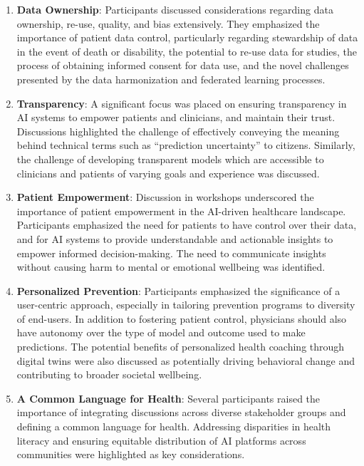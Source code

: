 \documentclass[
  letterpaper,
  DIV=11,
  numbers=noendperiod]{scrreport}
\begin{document}
\begin{enumerate}
\def\labelenumi{\arabic{enumi}.}
\item
  \textbf{Data Ownership}: Participants discussed considerations
  regarding data ownership, re-use, quality, and bias extensively. They
  emphasized the importance of patient data control, particularly
  regarding stewardship of data in the event of death or disability, the
  potential to re-use data for studies, the process of obtaining
  informed consent for data use, and the novel challenges presented by
  the data harmonization and federated learning processes.
\item
  \textbf{Transparency}: A significant focus was placed on ensuring
  transparency in AI systems to empower patients and clinicians, and
  maintain their trust. Discussions highlighted the challenge of
  effectively conveying the meaning behind technical terms such as
  ``prediction uncertainty'' to citizens. Similarly, the challenge of
  developing transparent models which are accessible to clinicians and
  patients of varying goals and experience was discussed.
\item
  \textbf{Patient Empowerment}: Discussion in workshops underscored the
  importance of patient empowerment in the AI-driven healthcare
  landscape. Participants emphasized the need for patients to have
  control over their data, and for AI systems to provide understandable
  and actionable insights to empower informed decision-making. The need
  to communicate insights without causing harm to mental or emotional
  wellbeing was identified.
\item
  \textbf{Personalized Prevention}: Participants emphasized the
  significance of a user-centric approach, especially in tailoring
  prevention programs to diversity of end-users. In addition to
  fostering patient control, physicians should also have autonomy over
  the type of model and outcome used to make predictions. The potential
  benefits of personalized health coaching through digital twins were
  also discussed as potentially driving behavioral change and
  contributing to broader societal wellbeing.
\item
  \textbf{A Common Language for Health}: Several participants raised the
  importance of integrating discussions across diverse stakeholder
  groups and defining a common language for health. Addressing
  disparities in health literacy and ensuring equitable distribution of
  AI platforms across communities were highlighted as key
  considerations.
\end{enumerate}
\end{document}
